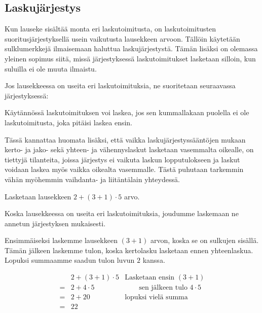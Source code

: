 \subsection*{Laskujärjestys}

Kun lauseke sisältää monta eri laskutoimitusta, on laskutoimitusten suoritusjärjestyksellä usein vaikutusta lausekkeen arvoon. Tällöin käytetään sulklumerkkejä ilmaisemaan haluttua laskujärjestystä. Tämän lisäksi on olemassa yleinen sopimus siitä, missä järjestyksessä laskutoimitukset lasketaan silloin, kun suluilla ei ole muuta ilmaistu.

Jos lausekkeessa on useita eri laskutoimituksia, ne suoritetaan seuraavassa järjestyksessä:


Käytännössä laskutoimituksen voi laskea, jos sen kummallakaan puolella ei ole laskutoimitusta, joka pitäisi laskea ensin.

Tässä kannattaa huomata lisäksi, että vaikka laskujärjestyssääntöjen mukaan kerto- ja jako- sekä yhteen- ja vähennyslaskut lasketaan vasemmalta oikealle, on tiettyjä tilanteita, joissa järjestys ei vaikuta laskun lopputulokseen ja laskut voidaan laskea myös vaikka oikealta vasemmalle. Tästä puhutaan tarkemmin vähän myöhemmin vaihdanta- ja liitäntälain yhteydessä.

\begin{esimerkki}
Lasketaan lausekkeen $2+(3+1)\cdot 5$ arvo.

Koska lausekkeessa on useita eri laskutoimituksia, joudumme laskemaan ne annetun järjestyksen mukaisesti.

Ensimmäiseksi laskemme lausekkeen $(3+1)$ arvon, koska se on sulkujen sisällä. Tämän jälkeen laskemme tulon, koska kertolasku lasketaan ennen yhteenlaskua. Lopuksi summaamme saadun tulon luvun $2$ kanssa.

\begin{align*}
   &2+(3+1)\cdot 5&\textrm{Lasketaan ensin } (3+1)
\\= &2+4\cdot5&\qquad\textrm{sen jälkeen tulo } 4\cdot 5
\\= &2+20& \textrm{lopuksi vielä summa}
\\= &22&
\end{align*}
\end{esimerkki}

